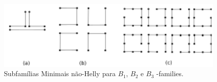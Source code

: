 \begin{figure}[!h]
\begin{center}
\includegraphics[width=12cm]{./img/b1epgSub.pdf}
\end{center}
\caption{Subfamílias Minimais não-Helly para $B_1$, $B_2$ e $B_3$ -families.}
\label{fig:b1b2b3families}
\end{figure}

